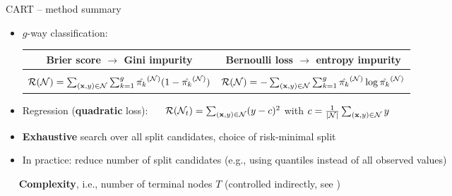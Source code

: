 \begin{frame}{CART -- method summary}
\begin{itemize}
\begin{itemize}
      \item $g$-way classification:
      \begin{tabular}{c |@{\vline}| c} 
 \textbf{Brier score} $\rightarrow$ \textbf{Gini} impurity & \textbf{Bernoulli} loss $\rightarrow$ \textbf{entropy} impurity \\ 
 \hline\\[-2ex]
 $\mathcal{R}(\mathcal{N}) = \sum_{(\mathbf{x},y) \in \mathcal{N}} \sum_{k=1}^g
      \hat{\pi_{k}}^{(\mathcal{N})} (1 - \hat{\pi_{k}}^{(\mathcal{N})} )$ & $\mathcal{R}(\mathcal{N}) = -\sum_{(\mathbf{x},y) \in \mathcal{N}} \sum_{k=1}^g
      \hat{\pi_{k}}^{(\mathcal{N})} \log \hat{\pi_{k}}^{(\mathcal{N})}$
\end{tabular}
      
    \item Regression (\textbf{quadratic} loss): ~~
    $\mathcal{R}(\mathcal{N}_t) = \sum_{(\mathbf{x},y) \in \mathcal{N}} (y - c)^2$ with $c = \frac{1}{|\mathcal{N}|} \sum_{(\mathbf{x},y) \in \mathcal{N}} y$
  \end{itemize}
\end{itemize}

\medskip


\begin{itemize}
  \item \textbf{Exhaustive} search over all split candidates, choice of 
  risk-minimal split
  \item In practice: reduce number of split candidates (e.g., using quantiles instead of all observed values)
\end{itemize}

\medskip

 ~~ \textbf{Complexity}, i.e., 
number of terminal nodes $T$ (controlled indirectly, see ) 

\end{frame}


